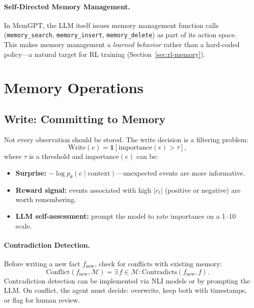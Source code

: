 \paragraph{Self-Directed Memory Management.}
\label{self-directed-memory-management.}

In MemGPT, the LLM itself issues memory management function calls (\texttt{memory\_search}, \texttt{memory\_insert}, \texttt{memory\_delete}) as part of its action space. This makes memory management a \emph{learned behavior} rather than a hard-coded policy---a natural target for RL training (Section~\ref{sec:rl-memory}).

\section{Memory Operations}
\label{sec:memory-operations}

\subsection{Write: Committing to Memory}
\label{write-committing-to-memory}

Not every observation should be stored. The write decision is a filtering problem: 
\[
\text{Write}(e) = \mathbf{1}\!\left[\text{importance}(e) > \tau\right],
\]
 where $\tau$ is a threshold and $\text{importance}(e)$ can be:

\begin{itemize}
  \item \textbf{Surprise:} $-\log p_\theta(e \mid \text{context})$---unexpected events are more informative.
  \item \textbf{Reward signal:} events associated with high $|r_t|$ (positive or negative) are worth remembering.
  \item \textbf{LLM self-assessment:} prompt the model to rate importance on a 1--10 scale.
\end{itemize}

\paragraph{Contradiction Detection.}
\label{contradiction-detection.}

Before writing a new fact $f_\text{new}$, check for conflicts with existing memory: 
\[
\text{Conflict}(f_\text{new}, \mathcal{M}) = \exists\, f \in \mathcal{M} : \text{Contradicts}(f_\text{new}, f).
\]
 Contradiction detection can be implemented via NLI models or by prompting the LLM. On conflict, the agent must decide: overwrite, keep both with timestamps, or flag for human review.

